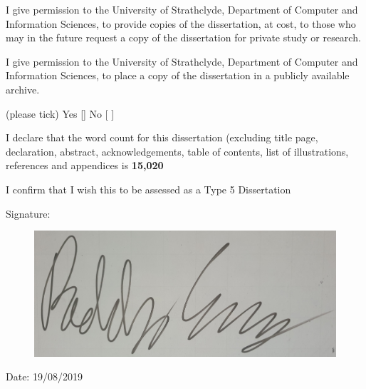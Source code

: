\documentclass[a4paper,12pt]{article}
\begin{document}
I give permission to the University of Strathclyde, Department of Computer and Information Sciences, to provide copies of the dissertation, at cost, to those who may in the future request a copy of the dissertation for private study or research. 

I give permission to the University of Strathclyde, Department of Computer and Information Sciences, to place a copy of the dissertation in a publicly available archive. 

(please tick) Yes [\checkmark ] No [ ] 

I declare that the word count for this dissertation (excluding title page, declaration, abstract, acknowledgements, table of contents, list of illustrations, references and appendices is \textbf{15,020} 

I confirm that I wish this to be assessed as a Type 5 Dissertation 


Signature: 
\begin{figure}[h!]
    \hspace{3cm}
    \includegraphics[scale = 0.025]{signature.jpg}
\end{figure}


Date: 19/08/2019

\newpage
\end{document}
